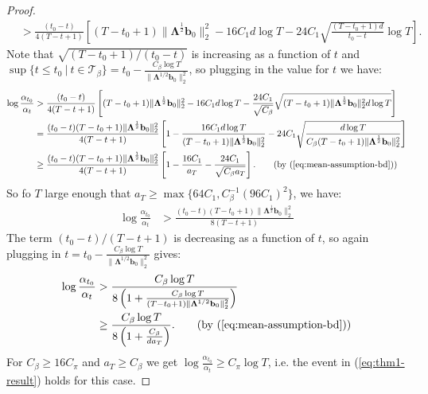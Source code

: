 \begin{proof}
\begin{align*}
    &> \frac{(t_0 - t) }{4(T-t+1)}\left[(T-t_0+1)\lVert\boldsymbol{\Lambda}^{\frac{1}{2}} \mathbf{b}_0\rVert^2_2 -16C_1d\log T - 24C_1\sqrt{\frac{(T-t_0+1)d}{t_0-t}}\log T\right]. \tag{$T-t+1 > T - t_0+1$}
\end{align*}
Note that $\sqrt{(T-t_0+1)/(t_0-t)}$ is increasing as a function of $t$ and $\sup \{t \leq t_0 \:|\:t\in\mathcal{T}_\beta\} = t_0 - \frac{C_\beta\log T}{\lVert\boldsymbol{\Lambda}^{1/2}\mathbf{b}_0\rVert_2^2}$, so plugging in the value for $t$ we have:
\begin{align*}
    \log \frac{\alpha_{t_0}}{\alpha_t} &> \frac{(t_0 - t) }{4(T-t+1)}\left[(T-t_0+1)\lVert\boldsymbol{\Lambda}^{\frac{1}{2}} \mathbf{b}_0\rVert^2_2 -16C_1d\log T - \frac{24C_1}{\sqrt{C_\beta}}\sqrt{(T-t_0+1)\lVert\boldsymbol{\Lambda}^{\frac{1}{2}} \mathbf{b}_0\rVert_2^2d\log T}\right] \\
    &= \frac{(t_0 - t) (T-t_0+1)\lVert\boldsymbol{\Lambda}^{\frac{1}{2}} \mathbf{b}_0\rVert^2_2}{4(T-t+1)}\left[1 - \frac{16C_1d\log T}{(T-t_0+1)\lVert\boldsymbol{\Lambda}^{\frac{1}{2}} \mathbf{b}_0\rVert^2_2} - 24C_1\sqrt{\frac{d\log T}{C_\beta (T-t_0+1)\lVert\boldsymbol{\Lambda}^{\frac{1}{2}} \mathbf{b}_0\rVert_2^2}}\right] \\
    &\geq  \frac{(t_0 - t) (T-t_0+1)\lVert\boldsymbol{\Lambda}^{\frac{1}{2}} \mathbf{b}_0\rVert^2_2}{4(T-t+1)}\left[1 - \frac{16C_1}{a_T} - \frac{24C_1}{\sqrt{C_\beta a_T}}\right]. \tag{by (\ref{eq:mean-assumption-bd})}
\end{align*}
So fo $T$ large enough that $a_T \geq \max\{64C_1,C_\beta^{-1}(96C_1)^2\}$, we have: 
\begin{align*}
      \log \frac{\alpha_{t_0}}{\alpha_t} &>\frac{(t_0 - t) (T-t_0+1)\lVert\boldsymbol{\Lambda}^{\frac{1}{2}} \mathbf{b}_0\rVert^2_2}{8(T-t+1)}
\end{align*}
The term $(t_0 - t)/ (T-t+1)$ is decreasing as a function of $t$, so again plugging in $t = t_0 - \frac{C_\beta\log T}{\lVert\boldsymbol{\Lambda}^{1/2}\mathbf{b}_0\rVert_2^2}$ gives:
\begin{align*}
    \log \frac{\alpha_{t_0}}{\alpha_t} &> \frac{ C_\beta\log T}{8\left(1 + \frac{C_\beta\log T}{(T-t_0+1)\lVert\boldsymbol{\Lambda}^{1/2}\mathbf{b}_0\rVert_2^2} \right)} \\
    &\geq  \frac{ C_\beta\log T}{8\left(1 + \frac{C_\beta}{da_T} \right)}. \tag{by (\ref{eq:mean-assumption-bd})}
\end{align*}
For $C_\beta \geq 16 C_\pi$ and $a_T \geq C_\beta$ we get $\log \frac{\alpha_{t_0}}{\alpha_t} \geq C_\pi\log T$, i.e. the event in (\ref{eq:thm1-result}) holds for this case.
\end{proof}